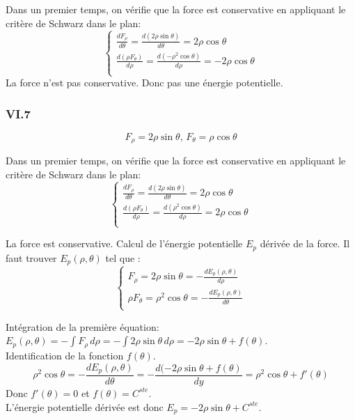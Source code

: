\documentclass[]{book}
\theoremstyle{definition}
\begin{document}
Dans un premier temps, on v\'erifie que la force est conservative en appliquant le crit\`ere de Schwarz dans le plan:
$$
\left\{
\begin{array}{l }
	\frac{dF_{\rho}}{d\theta} = \frac{d(2\rho \sin \theta)}{d\theta} = 2\rho \cos \theta\\
	\frac{d(\rho F_{\theta})}{d\rho} = \frac{d(-\rho^2 \cos \theta)}{d\rho} = -2\rho \cos \theta\\
\end{array}
\right. 
$$
La force n'est pas conservative. Donc pas une \'energie potentielle.

\subsubsection*{VI.7}
$$F_{\rho} = 2\rho \sin \theta,\, F_{\theta} = \rho \cos \theta$$

Dans un premier temps, on v\'erifie que la force est conservative en appliquant le crit\`ere de Schwarz dans le plan:
$$
\left\{
\begin{array}{l }
	\frac{dF_{\rho}}{d\theta} = \frac{d(2\rho \sin \theta)}{d\theta} = 2\rho \cos \theta\\
	\frac{d(\rho F_{\theta})}{d\rho} = \frac{d(\rho^2 \cos \theta)}{d\rho} = 2\rho \cos \theta\\
\end{array}
\right. 
$$

La force est conservative. Calcul de l'\'energie potentielle $E_p$ d\'eriv\'ee de la force. Il faut trouver $E_p(\rho,\theta)$ tel que :
$$
\left\{
\begin{array}{l }
	F_{\rho} = 2\rho \sin \theta = -\frac{dE_p(\rho,\theta)}{d\rho} \\
	\rho F_{\theta} =  \rho^2 \cos \theta = -\frac{dE_p(\rho,\theta)}{d\theta} \\
\end{array}
\right. 
$$

Int\'egration de la premi\`ere \'equation: $E_p(\rho,\theta) = -\int{F_{\rho}\, d\rho} = -\int{2\rho \sin \theta\, d\rho} = -2\rho \sin \theta + f(\theta)$.\\
Identification de la fonction $f(\theta)$. 
$$\rho^2 \cos \theta = -\frac{dE_p(\rho,\theta)}{d\theta} = -\frac{d(-2\rho \sin \theta + f(\theta)}{dy} = \rho^2 \cos \theta + f'(\theta)$$
Donc $f'(\theta) = 0$ et $f(\theta) = C^{ste}$.\\

L'\'energie potentielle d\'eriv\'ee est donc $E_p = -2\rho \sin \theta + C^{ste}$.
\end{document}
